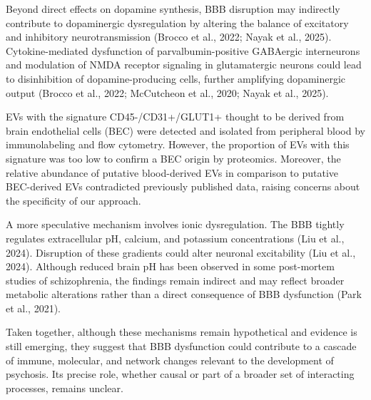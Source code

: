 \documentclass[authordate, empirical, issue]{jote-new-article}
\begin{document}
	Beyond direct effects on dopamine synthesis, BBB disruption may indirectly contribute to dopaminergic dysregulation by altering the balance of excitatory and inhibitory neurotransmission (Brocco et al., 2022; Nayak et al., 2025). Cytokine-mediated dysfunction of parvalbumin-positive GABAergic interneurons and modulation of NMDA receptor signaling in glutamatergic neurons could lead to disinhibition of dopamine-producing cells, further amplifying dopaminergic output (Brocco et al., 2022; McCutcheon et al., 2020; Nayak et al., 2025).



	\begin{takeHomeMessage}EVs with the signature CD45-/CD31+/GLUT1+ thought to be derived from brain endothelial cells (BEC) were detected and isolated from peripheral blood by immunolabeling and flow cytometry. However, the proportion of EVs with this signature was too low to confirm a BEC origin by proteomics. Moreover, the relative abundance of putative blood-derived EVs in comparison to putative BEC-derived EVs contradicted previously published data, raising concerns about the specificity of our approach.
	\end{takeHomeMessage}

	A more speculative mechanism involves ionic dysregulation. The BBB tightly regulates extracellular pH, calcium, and potassium concentrations (Liu et al., 2024). Disruption of these gradients could alter neuronal excitability (Liu et al., 2024). Although reduced brain pH has been observed in some post-mortem studies of schizophrenia, the findings remain indirect and may reflect broader metabolic alterations rather than a direct consequence of BBB dysfunction (Park et al., 2021).



	Taken together, although these mechanisms remain hypothetical and evidence is still emerging, they suggest that BBB dysfunction could contribute to a cascade of immune, molecular, and network changes relevant to the development of psychosis. Its precise role, whether causal or part of a broader set of interacting processes, remains unclear.
\end{document}
